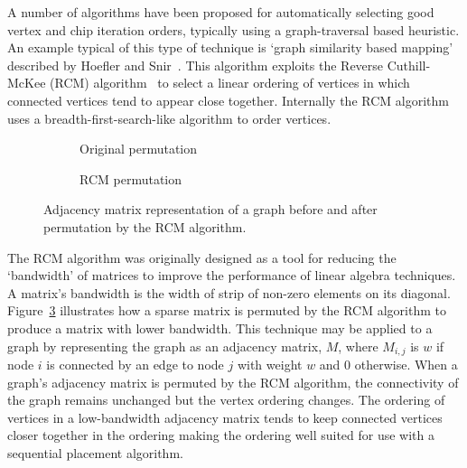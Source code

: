 				A number of algorithms have been proposed for automatically selecting
				good vertex and chip iteration orders, typically using a
				graph-traversal based heuristic. An example typical of this type of
				technique is `graph similarity based mapping' described by Hoefler and
				Snir~\cite{hoefler11}. This algorithm exploits the Reverse
				Cuthill-McKee (RCM) algorithm~\cite{cuthill69} to select a linear
				ordering of vertices in which connected vertices tend to appear close
				together. Internally the RCM algorithm uses a breadth-first-search-like
				algorithm to order vertices.
				
				\begin{figure}
					\center
					\begin{subfigure}{0.45\linewidth}
						\center
						
						\caption{Original permutation}
						\label{fig:rcm-initial}
					\end{subfigure}
					\begin{subfigure}{0.45\linewidth}
						\center
						
						\caption{RCM permutation}
						\label{fig:rcm-sorted}
					\end{subfigure}
					
					\caption[Graph adjacency matrix before and after RCM permutation.]%
					{Adjacency matrix representation of a graph before and after
					permutation by the RCM algorithm.}
					\label{fig:rcm}
				\end{figure}
				
				The RCM algorithm was originally designed as a tool for reducing the
				`bandwidth' of matrices to improve the performance of linear algebra
				techniques. A matrix's bandwidth is the width of strip of non-zero
				elements on its diagonal. Figure~\ref{fig:rcm} illustrates how a sparse
				matrix is permuted by the RCM algorithm to produce a matrix with lower
				bandwidth. This technique may be applied to a graph by representing the
				graph as an adjacency matrix, $M$, where $M_{i,j}$ is $w$ if node $i$
				is connected by an edge to node $j$ with weight $w$ and 0 otherwise.
				When a graph's adjacency matrix is permuted by the RCM algorithm, the
				connectivity of the graph remains unchanged but the vertex ordering
				changes. The ordering of vertices in a low-bandwidth adjacency matrix
				tends to keep connected vertices closer together in the ordering making
				the ordering well suited for use with a sequential placement algorithm.
				
